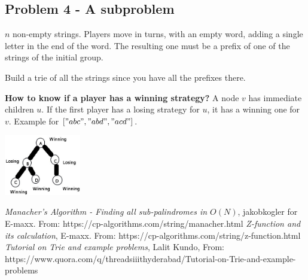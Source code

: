 \documentclass{IEEEtran}
\begin{document}
    \subsection{Problem 4 - A subproblem}
      $n$ non-empty strings. Players move in turns, with an empty word, adding a single letter in the end of the word. The resulting one must be a prefix of one of the strings of the initial group.\par 
      Build a trie of all the strings since you have all the prefixes there. \par 
      \textbf{How to know if a player has a winning strategy?} A node $v$ has immediate children $u$. If the first player has a losing strategy for $u$, it has a winning one for $v$. Example for $["abc","abd","acd"]$.
      \begin{center}
        \includegraphics[width=0.25\textwidth]{trieExampleSubProblem.png}
      \end{center}
  \begin{thebibliography}{}
      \textit{Manacher's Algorithm - Finding all sub-palindromes in $O(N)$},
      jakobkogler for E-maxx.
      From: https://cp-algorithms.com/string/manacher.html
      \textit{Z-function and its calculation},
      E-maxx.
      From: https://cp-algorithms.com/string/z-function.html
      \textit{Tutorial on Trie and example problems},
      Lalit Kundo,
      From: https://www.quora.com/q/threadsiiithyderabad/Tutorial-on-Trie-and-example-problems
  \end{thebibliography}
\end{document}
